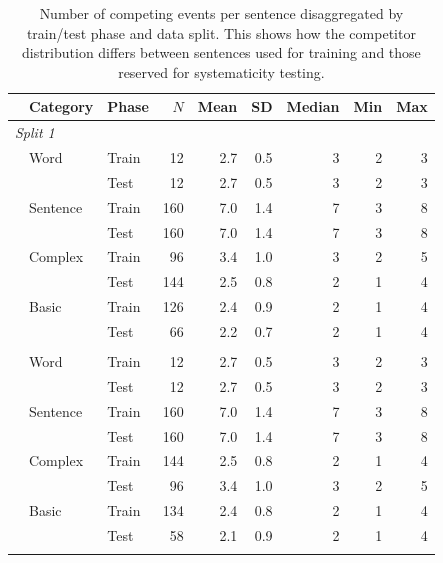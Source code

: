 \begin{table}[t]
\centering\scriptsize
\begin{tabular}{@{}lllrrrrrr@{}}
\toprule
 & \textbf{Category} & \textbf{Phase} & \textbf{$N$} & \textbf{Mean} & \textbf{SD} & \textbf{Median} & \textbf{Min} & \textbf{Max} \\
\midrule
\multicolumn{9}{l}{\textit{Split 1}} \\
\addlinespace[2pt]
 & Word & Train & 12 & 2.7 & 0.5 & 3 & 2 & 3 \\
 &  & Test & 12 & 2.7 & 0.5 & 3 & 2 & 3 \\
\addlinespace[2pt]
 & Sentence & Train & 160 & 7.0 & 1.4 & 7 & 3 & 8 \\
 &  & Test & 160 & 7.0 & 1.4 & 7 & 3 & 8 \\
\addlinespace[2pt]
 & Complex & Train & 96 & 3.4 & 1.0 & 3 & 2 & 5 \\
 &  & Test & 144 & 2.5 & 0.8 & 2 & 1 & 4 \\
\addlinespace[2pt]
 & Basic & Train & 126 & 2.4 & 0.9 & 2 & 1 & 4 \\
 &  & Test & 66 & 2.2 & 0.7 & 2 & 1 & 4 \\
\addlinespace[2pt]
\addlinespace
\multicolumn{9}{l}{\textit{Split 2}} \\
\addlinespace[2pt]
 & Word & Train & 12 & 2.7 & 0.5 & 3 & 2 & 3 \\
 &  & Test & 12 & 2.7 & 0.5 & 3 & 2 & 3 \\
\addlinespace[2pt]
 & Sentence & Train & 160 & 7.0 & 1.4 & 7 & 3 & 8 \\
 &  & Test & 160 & 7.0 & 1.4 & 7 & 3 & 8 \\
\addlinespace[2pt]
 & Complex & Train & 144 & 2.5 & 0.8 & 2 & 1 & 4 \\
 &  & Test & 96 & 3.4 & 1.0 & 3 & 2 & 5 \\
\addlinespace[2pt]
 & Basic & Train & 134 & 2.4 & 0.8 & 2 & 1 & 4 \\
 &  & Test & 58 & 2.1 & 0.9 & 2 & 1 & 4 \\
\addlinespace[2pt]
\bottomrule
\end{tabular}
\caption{\small Number of competing events per sentence disaggregated by train/test phase and data split. This shows how the competitor distribution differs between sentences used for training and those reserved for systematicity testing.}
\label{tab:competing_events_combined_by_phase}
\end{table}
